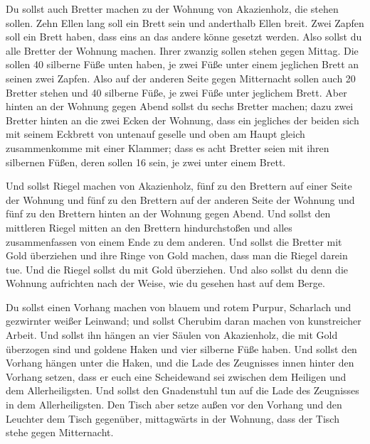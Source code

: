  Du sollst auch Bretter machen zu der Wohnung von
Akazienholz, die stehen sollen.  Zehn Ellen lang soll ein
Brett sein und anderthalb Ellen breit.  Zwei Zapfen soll
ein Brett haben, dass eins an das andere könne gesetzt werden. Also
sollst du alle Bretter der Wohnung machen.  Ihrer zwanzig
sollen stehen gegen Mittag.  Die sollen 40 silberne Füße
unten haben, je zwei Füße unter einem jeglichen Brett an seinen zwei
Zapfen.  Also auf der anderen Seite gegen Mitternacht
sollen auch 20 Bretter stehen  und 40 silberne Füße, je
zwei Füße unter jeglichem Brett.  Aber hinten an der
Wohnung gegen Abend sollst du sechs Bretter machen;  dazu
zwei Bretter hinten an die zwei Ecken der Wohnung,  dass
ein jegliches der beiden sich mit seinem Eckbrett von untenauf geselle
und oben am Haupt gleich zusammenkomme mit einer Klammer; 
dass es acht Bretter seien mit ihren silbernen Füßen, deren sollen 16
sein, je zwei unter einem Brett.

 Und sollst Riegel machen von Akazienholz, fünf zu den
Brettern auf einer Seite der Wohnung  und fünf zu den
Brettern auf der anderen Seite der Wohnung und fünf zu den Brettern
hinten an der Wohnung gegen Abend.  Und sollst den
mittleren Riegel mitten an den Brettern hindurchstoßen und alles
zusammenfassen von einem Ende zu dem anderen.  Und sollst
die Bretter mit Gold überziehen und ihre Ringe von Gold machen, dass man
die Riegel darein tue.  Und die Riegel sollst du mit Gold
überziehen. Und also sollst du denn die Wohnung aufrichten nach der
Weise, wie du gesehen hast auf dem Berge.

 Du sollst einen Vorhang machen von blauem und rotem
Purpur, Scharlach und gezwirnter weißer Leinwand; und sollst Cherubim
daran machen von kunstreicher Arbeit.  Und sollst ihn
hängen an vier Säulen von Akazienholz, die mit Gold überzogen sind und
goldene Haken und vier silberne Füße haben.  Und sollst den
Vorhang hängen unter die Haken, und die Lade des Zeugnisses innen hinter
den Vorhang setzen, dass er euch eine Scheidewand sei zwischen dem
Heiligen und dem Allerheiligsten.  Und sollst den
Gnadenstuhl tun auf die Lade des Zeugnisses in dem Allerheiligsten.
 Den Tisch aber setze außen vor den Vorhang und den
Leuchter dem Tisch gegenüber, mittagwärts in der Wohnung, dass der Tisch
stehe gegen Mitternacht.

